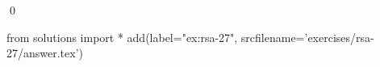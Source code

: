 
\begin{ex} 
  \label{ex:rsa-27}
  
  \qed
\end{ex} 
\begin{python0}
from solutions import *
add(label="ex:rsa-27",
    srcfilename='exercises/rsa-27/answer.tex') 
\end{python0}
